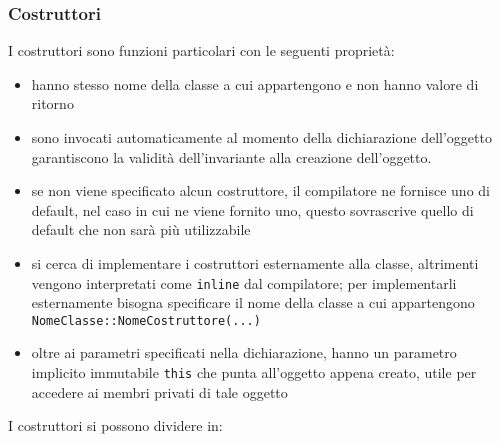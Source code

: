 \documentclass[a4paper]{article}
\begin{document}
\subsubsection*{Costruttori}
I costruttori sono funzioni particolari con le seguenti proprietà:
\begin{itemize}
	\item hanno stesso nome della classe a cui appartengono e non hanno valore di ritorno
	\item sono invocati automaticamente al momento della dichiarazione dell'oggetto garantiscono la validità dell'invariante
	alla creazione dell'oggetto.
	\item se non viene specificato alcun costruttore, il compilatore ne fornisce uno di default, nel caso in cui ne viene fornito
	uno, questo sovrascrive quello di default che non sarà più utilizzabile
	\item si cerca di implementare i costruttori esternamente alla classe, altrimenti vengono interpretati come \verb|inline|
	dal compilatore; per implementarli esternamente bisogna specificare il nome della classe a cui appartengono \verb|NomeClasse::NomeCostruttore(...)|
	\item oltre ai parametri specificati nella dichiarazione, hanno un parametro implicito immutabile \verb|this| che punta
	all'oggetto appena creato, utile per accedere ai membri privati di tale oggetto
\end{itemize}
I costruttori si possono dividere in:
\end{document}
